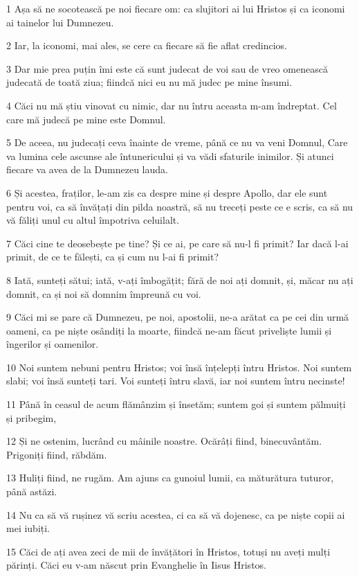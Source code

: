 \par 1 Așa să ne socotească pe noi fiecare om: ca slujitori ai lui Hristos și ca iconomi ai tainelor lui Dumnezeu.
\par 2 Iar, la iconomi, mai ales, se cere ca fiecare să fie aflat credincios.
\par 3 Dar mie prea puțin îmi este că sunt judecat de voi sau de vreo omenească judecată de toată ziua; fiindcă nici eu nu mă judec pe mine însumi.
\par 4 Căci nu mă știu vinovat cu nimic, dar nu întru aceasta m-am îndreptat. Cel care mă judecă pe mine este Domnul.
\par 5 De aceea, nu judecați ceva înainte de vreme, până ce nu va veni Domnul, Care va lumina cele ascunse ale întunericului și va vădi sfaturile inimilor. Și atunci fiecare va avea de la Dumnezeu lauda.
\par 6 Și acestea, fraților, le-am zis ca despre mine și despre Apollo, dar ele sunt pentru voi, ca să învățați din pilda noastră, să nu treceți peste ce e scris, ca să nu vă făliți unul cu altul împotriva celuilalt.
\par 7 Căci cine te deosebește pe tine? Și ce ai, pe care să nu-l fi primit? Iar dacă l-ai primit, de ce te fălești, ca și cum nu l-ai fi primit?
\par 8 Iată, sunteți sătui; iată, v-ați îmbogățit; fără de noi ați domnit, și, măcar nu ați domnit, ca și noi să domnim împreună cu voi.
\par 9 Căci mi se pare că Dumnezeu, pe noi, apostolii, ne-a arătat ca pe cei din urmă oameni, ca pe niște osândiți la moarte, fiindcă ne-am făcut priveliște lumii și îngerilor și oamenilor.
\par 10 Noi suntem nebuni pentru Hristos; voi însă înțelepți întru Hristos. Noi suntem slabi; voi însă sunteți tari. Voi sunteți întru slavă, iar noi suntem întru necinste!
\par 11 Până în ceasul de acum flămânzim și însetăm; suntem goi și suntem pălmuiți și pribegim,
\par 12 Și ne ostenim, lucrând cu mâinile noastre. Ocărâți fiind, binecuvântăm. Prigoniți fiind, răbdăm.
\par 13 Huliți fiind, ne rugăm. Am ajuns ca gunoiul lumii, ca măturătura tuturor, până astăzi.
\par 14 Nu ca să vă rușinez vă scriu acestea, ci ca să vă dojenesc, ca pe niște copii ai mei iubiți.
\par 15 Căci de ați avea zeci de mii de învățători în Hristos, totuși nu aveți mulți părinți. Căci eu v-am născut prin Evanghelie în Iisus Hristos.
